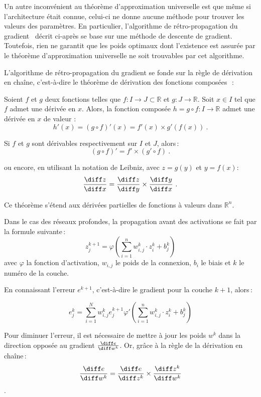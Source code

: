 Un autre inconvénient au théorème d'approximation universelle est que même si l'architecture était connue, celui-ci ne donne aucune méthode pour trouver les valeurs des paramètres. En particulier, l'algorithme de rétro-propagation du gradient~\cite{werbos_beyond_1975,rumelhart_learning_1986,lecun_learning_1986} décrit ci-après se base sur une méthode de descente de gradient. Toutefois, rien ne garantit que les poids optimaux dont l'existence est assurée par le théorème d'approximation universelle ne soit trouvables par cet algorithme.

L'algorithme de rétro-propagation du gradient se fonde sur la règle de dérivation en chaîne, c'est-à-dire le théorème de dérivation des fonctions composées~\cite{lhospital_analyse_1716,lagrange_theorie_1797}\,:
\begin{theorem}
Soient $f$ et $g$ deux fonctions telles que $f : I \rightarrow J \subset \mathbb{R}$ et $g : J \rightarrow \mathbb{R}$. Soit $x \in I$ tel que $f$ admet une dérivée en $x$. Alors, la fonction composée $h = g \circ f : I \rightarrow \mathbb{R}$ admet une dérivée en $x$ de valeur :
$$h'(x) = (g \circ f)'(x) = f'(x) \times g'(f(x))~.$$

Si $f$ et $g$ sont dérivables respectivement sur $I$ et $J$, alors\,:
$$(g \circ f)' = f' \times (g' \circ f)~.$$

ou encore, en utilisant la notation de Leibniz, avec $z = g(y)$ et $y = f(x)$:
$$\frac{\diff z}{\diff x} = \frac{\diff z}{\diff y} \times \frac{\diff y}{\diff x}~.$$
\end{theorem}

Ce théorème s'étend aux dérivées partielles de fonctions à valeurs dans $\mathbb{R}^n$.

Dans le cas des réseaux profondes, la propagation avant des activations se fait par la formule suivante\,:
$$z_j^{k+1} = \varphi\left(\sum_{i=1}^n w^k_{i,j} \cdot z^k_i + b^k_j\right)$$
avec $\varphi$ la fonction d'activation, $w_{i,j}$ le poids de la connexion, $b_i$ le biais et $k$ le numéro de la couche.

En connaissant l'erreur $e^{k+1}$, c'est-à-dire le gradient pour la couche $k+1$, alors\,:

$$e^k_j = \sum_{i=1}^N w^k_{i,j} e^{k+1}_j  \varphi'\left(\sum_{i=1}^n w^k_{i,j} \cdot z^k_i + b^k_j\right)$$

Pour diminuer l'erreur, il est nécessaire de mettre à jour les poids $w^k$ dans la direction opposée au gradient $\frac{\diff e}{\diff w^k}$. Or, grâce à la règle de la dérivation en chaîne\,:
$$\frac{\diff e}{\diff w^k} = \frac{\diff e}{\diff z^k} \times \frac{\diff z^k}{\diff w^k}$$.


